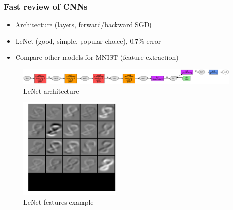 \documentclass[10pt]{beamer}
\begin{document}
\begin{frame}
    \frametitle{Fast review of CNNs}
    \begin{itemize}
        \item Architecture (layers, forward/backward SGD)
        \item LeNet (good, simple, popular choice), 0.7\% error
        \item Compare other models for MNIST (feature extraction)
    \end{itemize}

    \begin{figure}[h]
        \begin{center}
            \includegraphics{midpres_figures/lenet.png}
        \end{center}
        \caption{LeNet architecture}
    \end{figure}
    \begin{figure}[h]
        \begin{center}
            \includegraphics[width=0.45\textwidth]{midpres_figures/lenet_filter8.png}
        \end{center}
        \caption{LeNet features example}
    \end{figure}
\end{frame}
\end{document}
